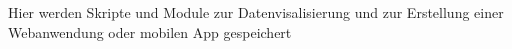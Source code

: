 Hier werden Skripte und Module zur Datenvisalisierung und zur Erstellung einer Webanwendung oder mobilen App gespeichert 